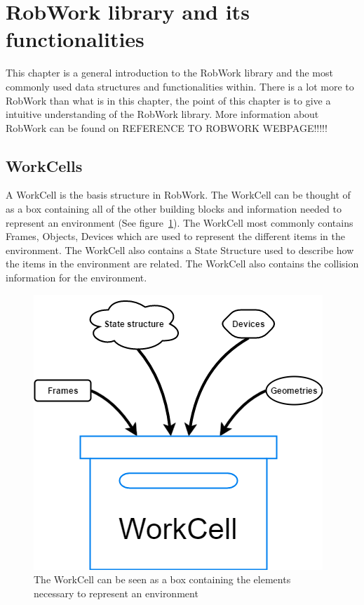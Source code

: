 \section{RobWork library and its functionalities}
This chapter is a general introduction to the RobWork library and the most commonly used data structures and functionalities within. There is a lot more to RobWork than what is in this chapter, the point of this chapter is to give a intuitive understanding of the RobWork library. More information about RobWork can be found on REFERENCE TO ROBWORK WEBPAGE!!!!!


\subsection{WorkCells}
A WorkCell is the basis structure in RobWork. The WorkCell can be thought of as a box containing all of the other building blocks and information needed to represent an environment (See figure~\ref{fig:WorkCellBoxExample}). The WorkCell most commonly contains Frames, Objects, Devices which are used to represent the different items in the environment. The WorkCell also contains a State Structure used to describe how the items in the environment are related. The WorkCell also contains the collision information for the environment.

\begin{figure}[h]
	\centering
	\includegraphics[scale=0.55]{Figures/WorkCellBoxExample.png}
	\caption{The WorkCell can be seen as a box containing the elements necessary to represent an environment}
	\label{fig:WorkCellBoxExample}
\end{figure}



